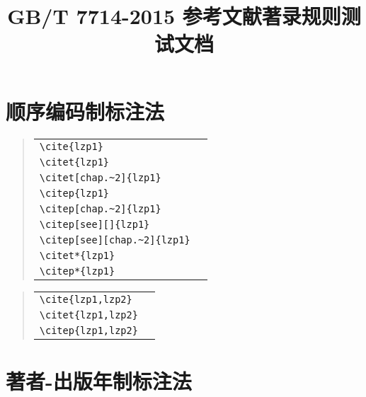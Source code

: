 \documentclass[UTF8,a4paper,zihao=5]{ctexart}
\begin{document}
\title{GB/T 7714-2015 参考文献著录规则测试文档}
\date{}
\maketitle

\section{顺序编码制标注法}

\begin{quote}
\begin{tabular}{l@{\quad$\Rightarrow$\quad}l}
  \verb|\cite{lzp1}| & \cite{lzp1}\\
  \verb|\citet{lzp1}| & \citet{lzp1}\\
  \verb|\citet[chap.~2]{lzp1}| & \citet[chap.~2]{lzp1}\\[0.5ex]
  \verb|\citep{lzp1}| & \citep{lzp1}\\
  \verb|\citep[chap.~2]{lzp1}| & \citep[chap.~2]{lzp1}\\
  \verb|\citep[see][]{lzp1}| & \citep[see][]{lzp1}\\
  \verb|\citep[see][chap.~2]{lzp1}| & \citep[see][chap.~2]{lzp1}\\[0.5ex]
  \verb|\citet*{lzp1}| & \citet*{lzp1}\\
  \verb|\citep*{lzp1}| & \citep*{lzp1}
\end{tabular}
\end{quote}
\begin{quote}
\begin{tabular}{l@{\quad$\Rightarrow$\quad}l}
  \verb|\cite{lzp1,lzp2}| & \cite{lzp1,lzp2}\\
  \verb|\citet{lzp1,lzp2}| & \citet{lzp1,lzp2}\\
  \verb|\citep{lzp1,lzp2}| & \citep{lzp1,lzp2}
\end{tabular}
\end{quote}

\section{著者-出版年制标注法}
\end{document}

